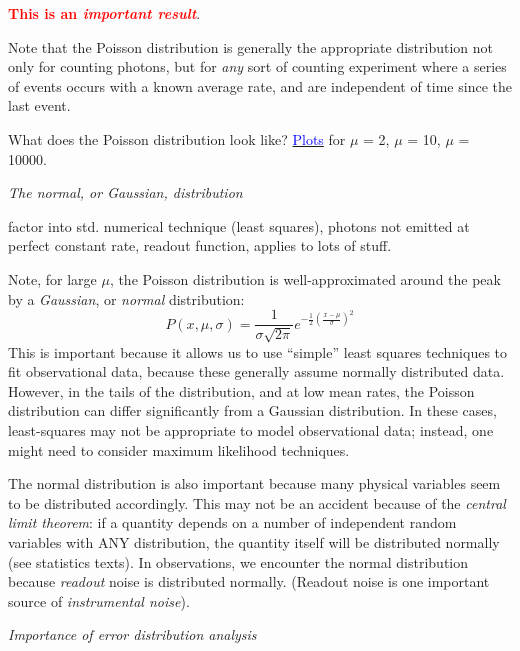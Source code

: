 \documentclass[12pt]{article}
\begin{document}
\textcolor{red}{\textbf{This is an \emph{important result}}}.

Note that the Poisson distribution is generally the
appropriate distribution not only for counting photons, but for
\emph{any} sort of counting experiment where a series of events
occurs with a known average rate, and are independent of time
since the last event.

What does the Poisson distribution look like?
\href{http://astronomy.nmsu.edu/holtz/a535/html/diagrams/a535/poisson.htm}
{\textcolor{blue}{Plots}}
for $\mu$ = 2, $\mu$ = 10, $\mu$ = 10000.

\emph{The normal, or Gaussian, distribution}

\textcolor{myBlue}{factor into std. numerical technique (least
squares), photons not emitted at perfect constant rate, readout
function, applies to lots of stuff}.

Note, for large $\mu$, the Poisson distribution is
well-approximated around the peak by a \emph{Gaussian}, or
\emph{normal} distribution:
    $$ P(x,\mu,\sigma) = \frac{1}{\sigma\sqrt{2\pi}}
        e^{ -\frac{1}{2} (\frac{x-\mu}{\sigma})^2 }  $$
This is important because it allows us to use ``simple'' least squares
techniques to fit observational data, because these generally assume
normally distributed data. However, in the tails of the
distribution, and at low mean rates, the Poisson distribution can
differ significantly from a Gaussian distribution. In these cases,
least-squares may not be appropriate to model observational data;
instead, one might need to consider maximum likelihood techniques.

The normal distribution is also important because many
physical variables seem to be distributed accordingly. This may not be
an accident because of the \emph{central limit theorem}: if a quantity
depends on a number of independent random variables with ANY
distribution, the quantity itself will be distributed normally (see
statistics texts). In observations, we encounter the normal
distribution because \emph{readout} noise is distributed normally.
(Readout noise is one important source of \emph{instrumental noise}).

\emph{Importance of error distribution analysis}
\end{document}

